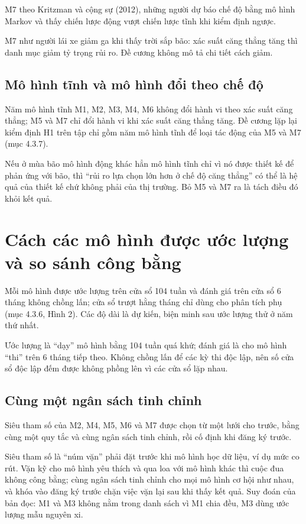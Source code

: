 M7 theo Kritzman và cộng sự (2012), những người dự báo chế độ bằng mô hình Markov và thấy chiến lược động vượt chiến lược tĩnh khi kiểm định ngược.

M7 như người lái xe giảm ga khi thấy trời sắp bão: xác suất căng thẳng tăng thì danh mục giảm tỷ trọng rủi ro. Đề cương không mô tả chi tiết cách giảm.

\subsection{Mô hình tĩnh và mô hình đổi theo chế độ}

Năm mô hình tĩnh M1, M2, M3, M4, M6 không đổi hành vi theo xác suất căng thẳng; M5 và M7 chỉ đổi hành vi khi xác suất căng thẳng tăng. Đề cương lặp lại kiểm định H1 trên tập chỉ gồm năm mô hình tĩnh để loại tác động của M5 và M7 (mục 4.3.7).

Nếu ở mùa bão mô hình động khác hẳn mô hình tĩnh chỉ vì nó được thiết kế để phản ứng với bão, thì “rủi ro lựa chọn lớn hơn ở chế độ căng thẳng” có thể là hệ quả của thiết kế chứ không phải của thị trường. Bỏ M5 và M7 ra là tách điều đó khỏi kết quả.

\section{Cách các mô hình được ước lượng và so sánh công bằng}

Mỗi mô hình được ước lượng trên cửa sổ 104 tuần và đánh giá trên cửa sổ 6 tháng không chồng lấn; cửa sổ trượt hằng tháng chỉ dùng cho phân tích phụ (mục 4.3.6, Hình 2). Các độ dài là dự kiến, biện minh sau ước lượng thử ở năm thứ nhất.

Ước lượng là “dạy” mô hình bằng 104 tuần quá khứ; đánh giá là cho mô hình “thi” trên 6 tháng tiếp theo. Không chồng lấn để các kỳ thi độc lập, nên số cửa sổ độc lập đếm được không phồng lên vì các cửa sổ lặp nhau.

\subsection{Cùng một ngân sách tinh chỉnh}

Siêu tham số của M2, M4, M5, M6 và M7 được chọn từ một lưới cho trước, bằng cùng một quy tắc và cùng ngân sách tinh chỉnh, rồi cố định khi đăng ký trước.

Siêu tham số là “núm vặn” phải đặt trước khi mô hình học dữ liệu, ví dụ mức co rút. Vặn kỹ cho mô hình yêu thích và qua loa với mô hình khác thì cuộc đua không công bằng; cùng ngân sách tinh chỉnh cho mọi mô hình cơ hội như nhau, và khóa vào đăng ký trước chặn việc vặn lại sau khi thấy kết quả. Suy đoán của bản đọc: M1 và M3 không nằm trong danh sách vì M1 chia đều, M3 dùng ước lượng mẫu nguyên xi.

